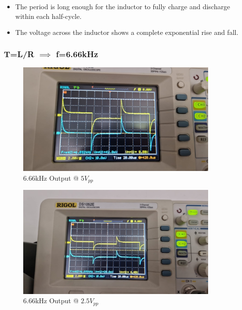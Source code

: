 \begin{itemize}
    \item The period is long enough for the inductor to fully charge and discharge within each half-cycle.
    \item The voltage across the inductor shows a complete exponential rise and fall.
\end{itemize}

\newpage{}
\thispagestyle{plain}

\subsubsection{T=L/R $\implies$ f=6.66kHz}

\begin{figure}[h]
    \centering
    \includegraphics[width=0.9\textwidth]{assets/6666-hz-5vpp.jpg}
    \caption{6.66kHz Output @ $5V_{pp}$}
    \label{fig:6666-hz-5vpp-output}
\end{figure}

\begin{figure}[h]
    \centering
    \includegraphics[width=0.9\textwidth]{assets/6666-hz-2.5vpp.jpg}
    \caption{6.66kHz Output @ $2.5V_{pp}$}
    \label{fig:6666-hz-2.5vpp-output}
\end{figure}

